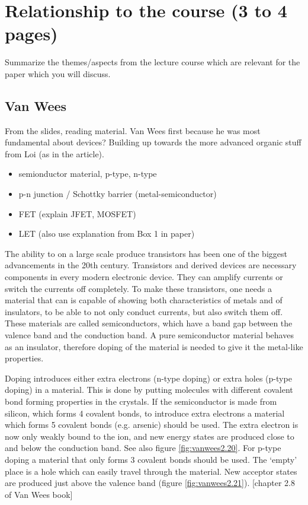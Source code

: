 \section{Relationship to the course (3 to 4 pages)}
Summarize the themes/aspects from the lecture course which are relevant for the paper which you will discuss. 



\subsection{Van Wees}
From the slides, reading material. Van Wees first because he was most fundamental about devices? Building up towards the more advanced organic stuff from Loi (as in the article).

\begin{itemize}
\item semionductor material, p-type, n-type
\item p-n junction / Schottky barrier (metal-semiconductor)
\item FET (explain JFET, MOSFET)
\item LET (also use explanation from Box 1 in paper)
\end{itemize}


The ability to on a large scale produce transistors has been one of the biggest advancements in the 20th century. Transistors and derived devices are necessary components in every modern electronic device. They can amplify currents or switch the currents off completely. To make these transistors, one needs a material that can is capable of showing both characteristics of metals and of insulators, to be able to not only conduct currents, but also switch them off. These materials are called semiconductors, which have a band gap between the valence band and the conduction band. A pure semiconductor material behaves as an insulator, therefore doping of the material is needed to give it the metal-like properties.

Doping introduces either extra electrons (n-type doping) or extra holes (p-type doping) in a material. This is done by putting molecules with different covalent bond forming properties in the crystals. If the semiconductor is made from silicon, which forms 4 covalent bonds, to introduce extra electrons a material which forms 5 covalent bonds (e.g. arsenic) should be used. The extra electron is now only weakly bound to the ion, and new energy states are produced close to and below the conduction band. See also figure \ref{fig:vanwees2.20}. For p-type doping a material that only forms 3 covalent bonds should be used. The `empty' place is a hole which can easily travel through the material. New acceptor states are produced just above the valence band (figure \ref{fig:vanwees2.21}). [chapter 2.8 of Van Wees book]

